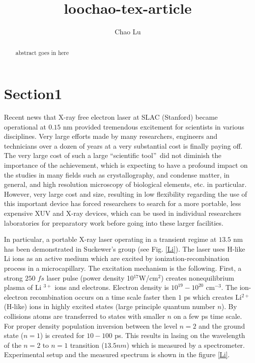 \documentclass[preprint,preprintnumbers]{revtex4}
\begin{document}
\title{ loochao-tex-article}
\author{Chao Lu}

\begin{abstract}
abstract goes in here
\end{abstract}

\maketitle

\section{Section1}

Recent news that X-ray free electron laser at SLAC (Stanford) became
operational at $0.15$ nm provided tremendous excitement for scientists in
various disciplines. Very large efforts made by many researchers, engineers
and technicians over a dozen of years at a very substantial cost is finally
paying off. The very large cost of such a large \textquotedblleft scientific
tool\textquotedblright\ did not diminish the importance of the achievement,
which is expecting to have a profound impact on the studies in many fields
such as crystallography, and condense matter, in general, and high
resolution microscopy of biological elements, etc. in particular. However,
very large cost and size, resulting in low flexibility regarding the use of
this important device has forced researchers to search for a more portable,
less expensive XUV and X-ray devices, which can be used in individual
researchers laboratories for preparatory work before going into these larger
facilities.

In particular, a portable X-ray laser operating in a transient regime at $%
13.5$ nm has been demonstrated in Suckewer's group \cite{Koro96} (see Fig. %
\ref{Li}). The laser uses H-like Li ions as an active medium which are
excited by ionization-recombination process in a microcapillary. The
excitation mechanism is the following. First, a strong $250$ $fs$ laser
pulse (power density 10$^{17}$W/cm$^{2}$) creates nonequilibrium plasma of Li%
$^{3+}$ ions and electrons. Electron density is $10^{19}-10^{20}$ cm$^{-3}$.
The ion-electron recombination occurs on a time scale faster then $1$ ps
which creates Li$^{2+}$ (H-like) ions in highly excited states (large
principle quantum number $n$). By collisions atoms are transferred to states
with smaller $n$ on a few ps time scale. For proper density population
inversion between the level $n=2$ and the ground state ($n=1$) is created
for $10-100$ ps. This results in lasing on the wavelength of the $n=2$ to $%
n=1$ transition ($13.5nm$) which is measured by a spectrometer. Experimental
setup and the measured spectrum is shown in the figure \ref{Li}.
\end{document}
